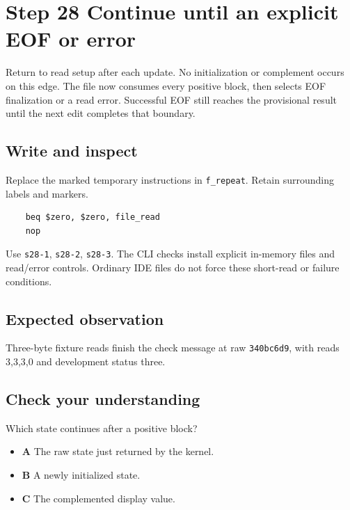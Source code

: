 \section{Step 28 Continue until an explicit EOF or error}\label{crc-s28}

Return to read setup after each update. No initialization or complement occurs on this edge. The file now consumes every positive block, then selects EOF finalization or a read error. Successful EOF still reaches the provisional result until the next edit completes that boundary.

\subsection{Write and inspect}
Replace the marked temporary instructions in \texttt{f\_repeat}. Retain surrounding labels and markers.

\begin{verbatim}
    beq $zero, $zero, file_read
    nop
\end{verbatim}

Use \texttt{s28-1}, \texttt{s28-2}, \texttt{s28-3}. The CLI checks install explicit in-memory files and read/error controls. Ordinary IDE files do not force these short-read or failure conditions.

\subsection{Expected observation}
Three-byte fixture reads finish the check message at raw \texttt{340bc6d9}, with reads 3,3,3,0 and development status three.

\subsection{Check your understanding}
Which state continues after a positive block?

\begin{itemize}
\item \textbf{A} The raw state just returned by the kernel.
\item \textbf{B} A newly initialized state.
\item \textbf{C} The complemented display value.
\end{itemize}
